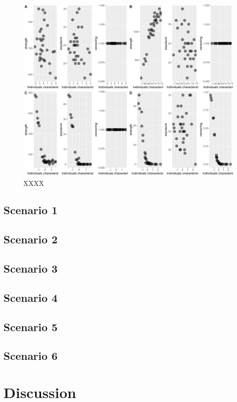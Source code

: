 \documentclass[Afour,sageh,times]{sagej}
\begin{document}
\begin{figure}[t]
  \caption{XXXX}\label{figSimTest}
  \centering
  \includegraphics[trim={0 0 0 0cm},clip,width=1\textwidth]{Figures/Appendix2/Figure3.png}
\end{figure}


\subsection{Scenario 1}

\subsection{Scenario 2}

\subsection{Scenario 3}

\subsection{Scenario 4}

\subsection{Scenario 5}

\subsection{Scenario 6}

\section{Discussion}




\end{document}
